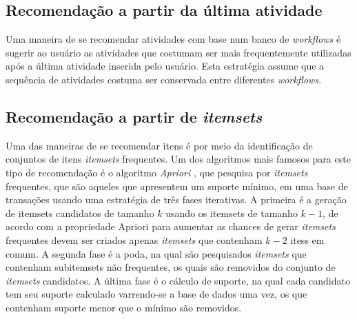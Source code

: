 \subsection{Recomendação a partir da última atividade}
Uma maneira de se recomendar atividades com base num banco de \emph{workflows} é sugerir ao usuário as atividades que costumam ser mais frequentemente utilizadas após a última atividade inserida pelo usuário. Esta estratégia assume que a sequência de atividades costuma ser conservada entre diferentes \emph{workflows}.

\subsection{Recomendação a partir de \emph{itemsets}}\label{AAPRIORI}
Uma das maneiras de se recomendar itens é por meio da identificação de conjuntos de itens \emph{itemsets} frequentes. Um dos algoritmos mais famosos para este tipo de recomendação é o algoritmo \emph{Apriori} \cite{Agrawal1994}, que pesquisa por \emph{itemsets} frequentes, que são aqueles que apresentem um suporte mínimo, em uma base de transações usando uma estratégia de três fases iterativas. A primeira é a geração de itemsets candidatos de tamanho \(k\) usando os itemsets de tamanho \(k-1\), de acordo com a propriedade Apriori para aumentar as chances de gerar \emph{itemsets} frequentes devem ser criados apenas \emph{itemsets} que contenham \(k-2\) itess em comum. A segunda fase é a poda, na qual são pesquisados \emph{itemsets} que contenham subitemsets não frequentes, os quais são removidos do conjunto de \emph{itemsets} candidatos. A última fase é o cálculo de suporte, na qual cada candidato tem seu suporte calculado varrendo-se a base de dados uma vez, os que contenham suporte menor que o mínimo são removidos. 

